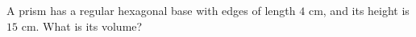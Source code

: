 A prism has a regular hexagonal base with edges of length $4$ cm, and its height is $15$ cm. What is its volume?
